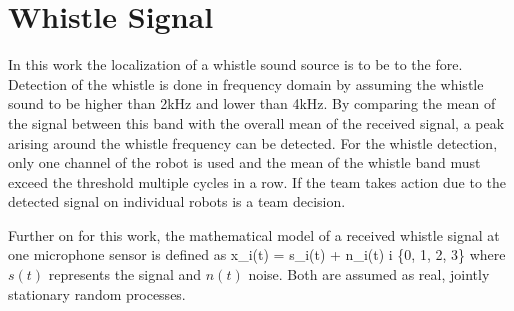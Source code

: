 \section{Whistle Signal}
\label{sec:02_whistleSignal}

In this work the localization of a whistle sound source is to be to the fore.
Detection of the whistle is done in frequency domain by assuming the whistle
sound to be higher than 2\si{\kilo\hertz} and lower than 4\si{\kilo\hertz}.
By comparing the mean of the signal between this band with the overall mean of the
received signal, a peak arising around the whistle frequency can be detected.
For the whistle detection, only one channel of the robot is used and the
mean of the whistle band must exceed the threshold multiple cycles in a row.
If the team takes action due to the detected signal on individual robots is a team decision.

Further on for this work, the mathematical model of a received whistle
signal at one microphone sensor is defined as
\be
x_i(t) = s_i(t) + n_i(t)  i \in \{0, 1, 2, 3\}
\label{eq:02_whistleSignal}
\ee
where $s(t)$ represents the signal and $n(t)$ noise.
Both are assumed as real, jointly stationary random processes.